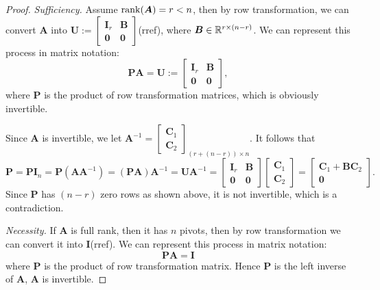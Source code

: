 \begin{proof}
\textit{Sufficiency.}
Assume $\operatorname{rank}(\bm A)=r<n$, then by row transformation, we can convert $\bm A$ into $\bm U := \begin{bmatrix}
\bm I_{r}&\bm B\\\bm 0&\bm 0
\end{bmatrix}$(rref), where $\bm B\in\mathbb{R}^{r\times(n-r)}$. We can represent this process in matrix notation:
\[
\bm P\bm A = \bm U:= \begin{bmatrix}
\bm I_{r}&\bm B\\\bm 0&\bm 0
\end{bmatrix},
\]
where $\bm P$ is the product of row transformation matrices, which is obviously invertible.

Since $\bm A$ is invertible, we let $\bm A^{-1} = \begin{bmatrix}
\bm C_{1}\\\bm C_{2}
\end{bmatrix}_{(r+(n-r))\times n}$. It follows that 
\[
\bm P = \bm P\bm I_{n}=\bm P(\bm A\bm A^{-1}) = (\bm{PA})\bm A^{-1} = \bm U\bm A^{-1} = \begin{bmatrix}
\bm I_{r}&\bm B\\\bm 0&\bm 0
\end{bmatrix}\begin{bmatrix}
\bm C_{1}\\\bm C_{2}
\end{bmatrix} = \begin{bmatrix}
\bm C_{1}+\bm B\bm C_{2}\\\bm 0
\end{bmatrix}.
\]
Since $\bm P$ has $(n-r)$ zero rows as shown above, it is not invertible, which is a contradiction.

\textit{Necessity.   }If $\bm A$ is full rank, then it has $n$ pivots, then by row transformation we can convert it into $\bm I$(rref). We can represent this process in matrix notation:
\[
\bm P\bm A = \bm I
\]
where $\bm P$ is the product of row transformation matrix. Hence $\bm P$ is the left inverse of $\bm A$, $\bm A$ is invertible.
\end{proof}

